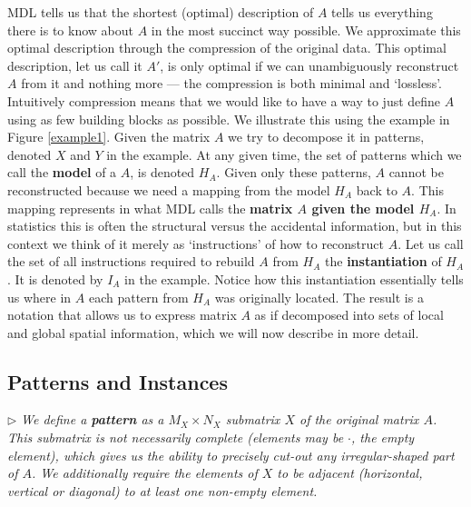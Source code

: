 \documentclass{llncs}
\begin{document}
MDL tells us that the shortest (optimal) description of $A$ tells us everything there is to know about $A$ in the most succinct way possible. We approximate this optimal description through the compression of the original data. This optimal description, let us call it $A'$, is only optimal if we can unambiguously reconstruct $A$ from it and nothing more --- the compression is both minimal and `lossless'. Intuitively compression means that we would like to have a way to just define $A$ using as few building blocks as possible. We illustrate this using the example in Figure \ref{example1}. Given the matrix $A$ we try to decompose it in patterns, denoted $X$ and $Y$ in the example. At any given time, the set of patterns which we call the \textbf{model} of a $A$, is denoted $H_A$. Given only these patterns, $A$ cannot be reconstructed because we need a mapping from the model $H_A$ back to $A$. This mapping represents in what MDL calls the \textbf{matrix $A$ given the model $H_A$}. In statistics this is often the structural versus the accidental information, but in this context we think of it merely as `instructions' of how to reconstruct $A$. Let us call the set of all instructions required to rebuild $A$ from $H_A$ the \textbf{instantiation} of $H_A$. It is denoted by ${I}_A$ in the example. Notice how this instantiation essentially tells us where in $A$ each pattern from $H_A$ was originally located.  The result is a notation that allows us to express matrix $A$ as if decomposed into sets of local and global spatial information, which we will now describe in more detail.



\subsection{Patterns and Instances}
\noindent $\triangleright$ \emph{We define a \textbf{pattern} as a $M_X\times N_X$ submatrix $X$ of the original matrix $A$. This submatrix is not necessarily complete (elements may be $\cdot$, the empty element), which gives us the ability to precisely cut-out any irregular-shaped part of $A$. We additionally require the elements of $X$ to be adjacent (horizontal, vertical or diagonal) to at least one non-empty element.}
\end{document}

